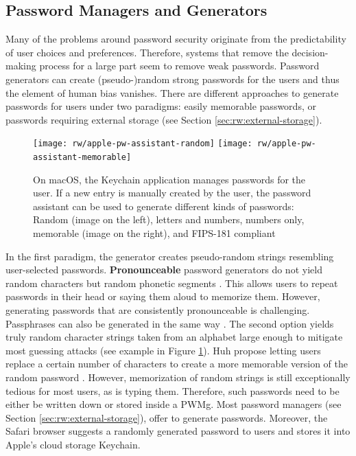 	
	\subsection{Password Managers and Generators}\label{sec:rw:pwm_generators}
	Many of the problems around password security originate from the predictability of user choices and preferences. Therefore, systems that remove the decision-making process for a large part seem to remove weak passwords. Password generators can create (pseudo-)random strong passwords for the users and thus the element of human bias vanishes. There are different approaches to generate passwords for users under two paradigms: easily memorable passwords, or passwords requiring external storage (see Section \ref{sec:rw:external-storage}). 
	\begin{figure}
		\centering
		\texttt{[image: rw/apple-pw-assistant-random]}
		\texttt{[image: rw/apple-pw-assistant-memorable]}
		\caption{\label{fig:rw:pw_generators} On macOS, the Keychain application manages passwords for the user. If a new entry is manually created by the user, the password assistant can be used to generate different kinds of passwords: Random (image on the left), letters and numbers, numbers only, memorable (image on the right), and FIPS-181 compliant}
	\end{figure}
	In the first paradigm, the generator creates pseudo-random strings resembling user-selected passwords. \textbf{Pronounceable} password generators do not yield random characters but random phonetic segments \cite{Gasser1975RandomWordPronouncable}. This allows users to repeat passwords in their head or saying them aloud to memorize them. However, generating passwords that are consistently pronounceable is challenging\cite{White2014IsntThatFabulous, Goldberg2015UnspeakablePasswords}. Passphrases can also be generated in the same way \cite{Kurzban1985Passphrases}. 
	The second option yields truly random character strings taken from an alphabet large enough to mitigate most guessing attacks (see example in Figure \ref{fig:rw:pw_generators}). Huh \etal propose letting users replace a certain number of characters to create a more memorable version of the random password \cite{Huha2015UserReplaceablePasswords}. However, memorization of random strings is still exceptionally tedious for most users, as is typing them. Therefore, such passwords need to be either be written down or stored inside a \gls{PWMg}. Most password managers (see Section \ref{sec:rw:external-storage}), offer to generate passwords. Moreover, the Safari browser suggests a randomly generated password to users and stores it into Apple's cloud storage Keychain. 
